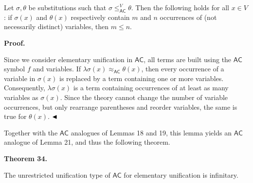 Let $\sigma,\theta$ be substitutions such that $\sigma\leq_{\mathsf{AC}}^{V}\theta$. Then the following holds for all $x\in V$: if $\sigma(x)$ and $\theta(x)$ respectively contain $m$ and $n$ occurrences of (not necessarily distinct) variables, then $m\leq n$.\par
 
 
 
 
 
\par\medskip\noindent\textbf{Proof.}\par
 
 
Since we consider elementary unification in $\mathsf{AC}$, all terms are built using the $\mathsf{AC}$ symbol $f$ and variables. If $\lambda\sigma(x)\approx_{\mathsf{AC}}\theta(x)$, then every occurrence of a variable in $\sigma(x)$ is replaced by a term containing one or more variables. Consequently, $\lambda\sigma(x)$ is a term containing occurrences of at least as many variables as $\sigma(x)$. Since the theory cannot change the number of variable occurrences, but only rearrange parentheses and reorder variables, the same is true for $\theta(x)$. $\hfill\blacktriangleleft$\par
 
 
 
Together with the $\mathsf{AC}$ analogues of Lemmas 18 and 19, this lemma yields an $\mathsf{AC}$ analogue of Lemma 21, and thus the following theorem.\par
 
 
 
\par\medskip\noindent\textbf{Theorem 34.}\par
 
 
The unrestricted unification type of $\mathsf{AC}$ for elementary unification is infinitary.\par
 
 
 
 
